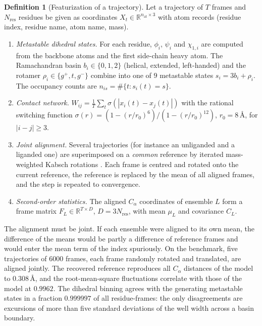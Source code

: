 \documentclass[11pt,reqno]{amsart}
\theoremstyle{plain}
\theoremstyle{definition}
\newtheorem{definition}[theorem]{Definition}
\theoremstyle{remark}
\numberwithin{equation}{section}
\begin{document}
\begin{definition}[Featurization of a trajectory]\label{def:features}
Let a trajectory of $T$ frames and $N_{\mathrm{res}}$ residues be given as coordinates $X_t\in\mathbb R^{n_{\mathrm{at}}\times3}$ with atom records (residue index, residue name, atom name, mass).
\begin{enumerate}[label=\textup{(\roman*)},leftmargin=*]
\item \emph{Metastable dihedral states.} For each residue, $\phi_i$, $\psi_i$ and $\chi_{1,i}$ are computed from the backbone atoms and the first side-chain heavy atom. The Ramachandran basin $b_i\in\{0,1,2\}$ (helical, extended, left-handed) and the rotamer $\rho_i\in\{g^+,t,g^-\}$ combine into one of $9$ metastable states $s_i=3b_i+\rho_i$. The occupancy counts are $n_{is}=\#\{t:s_i(t)=s\}$.
\item \emph{Contact network.} $W_{ij}=\frac1T\sum_t\sigma(|x_i(t)-x_j(t)|)$ with the rational switching function $\sigma(r)=(1-(r/r_0)^6)/(1-(r/r_0)^{12})$, $r_0=8$\,\AA, for $|i-j|\ge3$.
\item \emph{Joint alignment.} Several trajectories (for instance an unliganded and a liganded one) are superimposed on a \emph{common} reference by iterated mass-weighted Kabsch rotations \cite{Kabsch1976}. Each frame is centred and rotated onto the current reference, the reference is replaced by the mean of all aligned frames, and the step is repeated to convergence.
\item \emph{Second-order statistics.} The aligned $C_\alpha$ coordinates of ensemble $L$ form a frame matrix $F_L\in\mathbb R^{T\times D}$, $D=3N_{\mathrm{res}}$, with mean $\mu_L$ and covariance $C_L$.
\end{enumerate}
\end{definition}

The alignment must be joint. If each ensemble were aligned to its own mean, the difference of the means would be partly a difference of reference frames and would enter the mean term of the index spuriously. On the benchmark, five trajectories of $6000$ frames, each frame randomly rotated and translated, are aligned jointly. The recovered reference reproduces all $C_\alpha$ distances of the model to $0.308$\,\AA, and the root-mean-square fluctuations correlate with those of the model at $0.9962$. The dihedral binning agrees with the generating metastable states in a fraction $0.999997$ of all residue-frames: the only disagreements are excursions of more than five standard deviations of the well width across a basin boundary.
\end{document}
